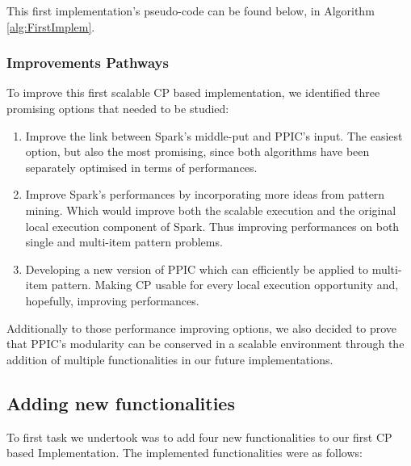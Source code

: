 \documentclass{eplmastersthesis}
\begin{document}
This first implementation's pseudo-code can be found below, in Algorithm \ref{alg:FirstImplem}.

\subsubsection{Improvements Pathways}

To improve this first scalable CP based implementation, we identified three promising options that needed to be studied:

\begin{enumerate}
	\item Improve the link between Spark's middle-put and PPIC's input. The easiest option, but also the most promising, since both algorithms have been separately optimised in terms of performances.
	\item Improve Spark's performances by incorporating more ideas from pattern mining.
Which would improve both the scalable execution and the original local execution component of Spark. Thus improving performances on both single and multi-item pattern problems.
	\item Developing a new version of PPIC which can efficiently be applied to multi-item pattern. Making CP usable for every local execution opportunity and, hopefully, improving performances.
\end{enumerate}

Additionally to those performance improving options, we also decided to prove that PPIC's modularity can be conserved in a scalable environment through the addition of multiple  functionalities in our future implementations.

\subsection{Adding new functionalities}

To first task we undertook was to add four new functionalities to our first CP based Implementation. The implemented functionalities were as follows:
\end{document}
